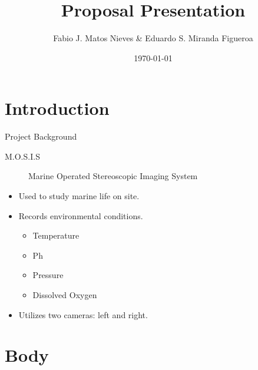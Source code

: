 \documentclass[14pt, aspectratio=169]{beamer}
\title{Proposal Presentation}
\author{Fabio J. Matos Nieves \& Eduardo S. Miranda Figueroa}
\institute{Univerity of Puerto Rico Mayagüez Campus}
\date{\today}
\begin{document}
\maketitle
\begin{frame}
	\tableofcontents
\end{frame}
\section{Introduction}
\begin{frame}{Project Background}
	\begin{description}
		\item[M.O.S.I.S] Marine Operated Stereoscopic Imaging System
	\end{description}
	\begin{itemize}
		\item Used to study marine life on site.
		\item Records environmental conditions.
		      \begin{itemize}
			      \item Temperature
			      \item Ph
			      \item Pressure
			      \item Dissolved Oxygen
		      \end{itemize}
		\item Utilizes two cameras: left and right.
	\end{itemize}
\end{frame}
\section{Body}
\end{document}
